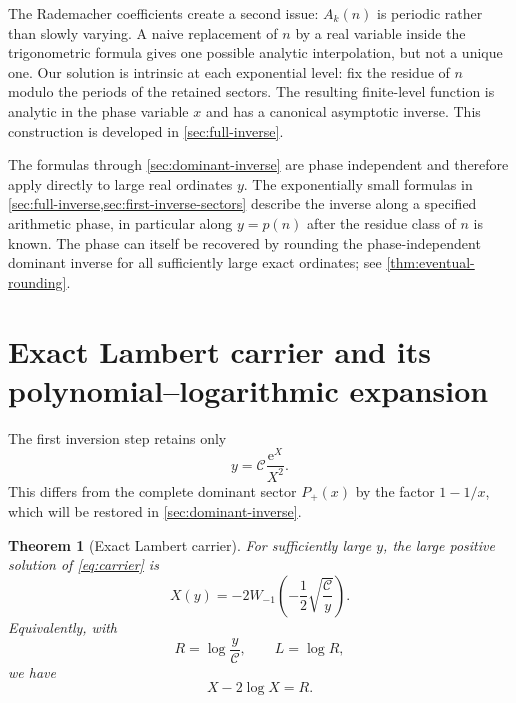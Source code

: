 \documentclass[11pt,a4paper]{article}
\numberwithin{equation}{section}
\newtheorem{theorem}{Theorem}[section]
\theoremstyle{remark}
\newcommand{\e}{\mathrm e}
\newcommand{\Ccal}{\mathcal C}
\begin{document}
The Rademacher coefficients create a second issue: $A_k(n)$ is periodic rather than slowly varying.  A naive replacement of $n$ by a real variable inside the trigonometric formula gives one possible analytic interpolation, but not a unique one.  Our solution is intrinsic at each exponential level: fix the residue of $n$ modulo the periods of the retained sectors.  The resulting finite-level function is analytic in the phase variable $x$ and has a canonical asymptotic inverse.  This construction is developed in \cref{sec:full-inverse}.

\begin{warningbox}
The formulas through \cref{sec:dominant-inverse} are phase independent and therefore apply directly to large real ordinates $y$.  The exponentially small formulas in \cref{sec:full-inverse,sec:first-inverse-sectors} describe the inverse along a specified arithmetic phase, in particular along $y=p(n)$ after the residue class of $n$ is known.  The phase can itself be recovered by rounding the phase-independent dominant inverse for all sufficiently large exact ordinates; see \cref{thm:eventual-rounding}.
\end{warningbox}

\section{Exact Lambert carrier and its polynomial--logarithmic expansion}\label{sec:Lambert-core}

The first inversion step retains only
\begin{equation}\label{eq:carrier}
 y=\Ccal\frac{\e^X}{X^2}.
\end{equation}
This differs from the complete dominant sector $P_+(x)$ by the factor $1-1/x$, which will be restored in \cref{sec:dominant-inverse}.

\begin{theorem}[Exact Lambert carrier]\label{thm:Lambert-carrier}
For sufficiently large $y$, the large positive solution of \cref{eq:carrier} is
\begin{equation}\label{eq:X-Lambert}
 \boxed{
 X(y)=-2W_{-1}\!\left(-\frac12\sqrt{\frac{\Ccal}{y}}\right).}
\end{equation}
Equivalently, with
\begin{equation}\label{eq:R-L}
 R=\log\frac{y}{\Ccal},\qquad L=\log R,
\end{equation}
we have
\begin{equation}\label{eq:X-phase}
 X-2\log X=R.
\end{equation}
\end{theorem}
\end{document}
